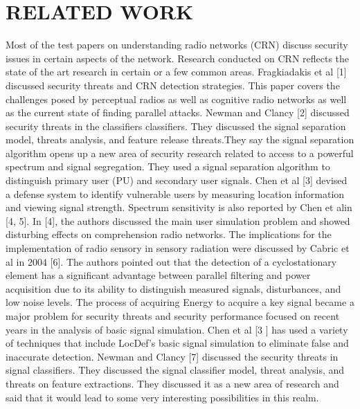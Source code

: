 \documentclass{article}
\begin{document}
\section{RELATED WORK}
Most of the test papers on understanding radio networks
(CRN) discuss security issues in certain aspects of the
network. Research conducted on CRN reflects the state of the
art research in certain or a few common areas. Fragkiadakis
et al [1] discussed security threats and CRN detection
strategies. This paper covers the challenges posed by
perceptual radios as well as cognitive radio networks as well
as the current state of finding parallel attacks.
Newman and Clancy [2] discussed security threats in the
classifiers classifiers. They discussed the signal separation
model, threats analysis, and feature release threats.They say
the signal separation algorithm opens up a new area of
security research related to access to a powerful spectrum
and signal segregation. They used a signal separation
algorithm to distinguish primary user (PU) and secondary
user signals. Chen et al [3] devised a defense system to
identify vulnerable users by measuring location information
and viewing signal strength. Spectrum sensitivity is also
reported by Chen et alin [4, 5]. In [4], the authors discussed
the main user simulation problem and showed disturbing
effects on comprehension radio networks.
The implications for the implementation of radio sensory in
sensory radiation were discussed by Cabric et al in 2004 [6].
The authors pointed out that the detection of a
cyclostationary element has a significant advantage between
parallel filtering and power acquisition due to its ability to
distinguish measured signals, disturbances, and low noise
levels. The process of acquiring Energy to acquire a key
signal became a major problem for security threats and
security performance focused on recent years in the analysis
of basic signal simulation. Chen et al [3 ] has used a variety
of techniques that include LocDef’s basic signal simulation
to eliminate false and inaccurate detection. Newman and
Clancy [7] discussed the security threats in signal classifiers.
They discussed the signal classifier model, threat analysis,
and threats on feature extractions. They discussed it as a new
area of research and said that it would lead to some very
interesting possibilities in this realm.


   
\end{document}
